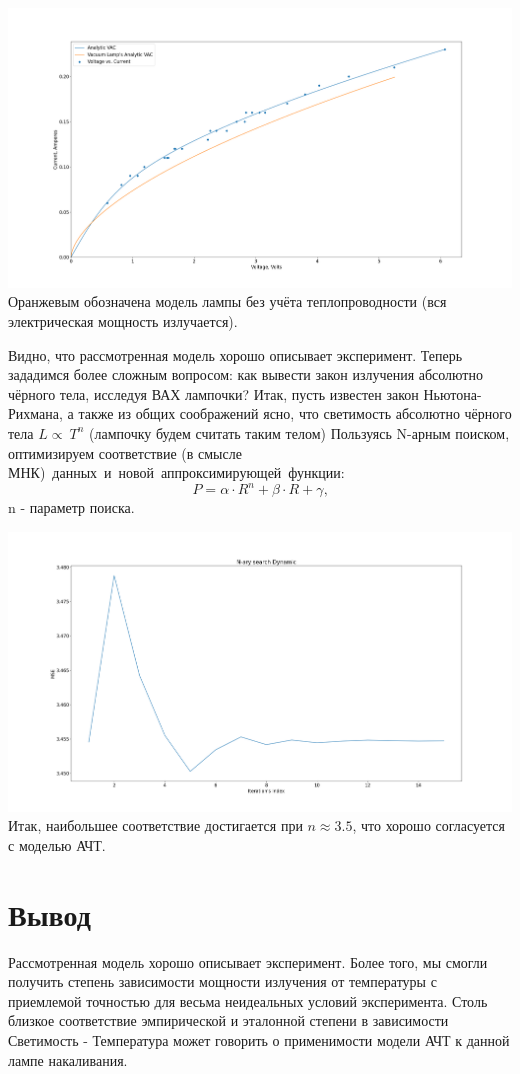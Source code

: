 \documentclass[12pt]{article}
\begin{document}
    {
        \centering
        \includegraphics[width=\linewidth]{images/Resultant_VAC.png}
        \label{fig:resultant-VAC}
    }
    Оранжевым обозначена модель лампы без учёта теплопроводности (вся электрическая мощность излучается).


    Видно, что рассмотренная модель хорошо описывает эксперимент. Теперь зададимся более сложным вопросом: как вывести закон излучения абсолютно чёрного тела, исследуя ВАХ лампочки? Итак, пусть известен закон Ньютона-Рихмана, а также из общих соображений ясно, что светимость абсолютно чёрного тела $ L \propto~ T^n $ (лампочку будем считать таким телом) Пользуясь N-арным поиском, оптимизируем соответствие (в смысле МНК)~данных~и~новой~аппроксимирующей~функции:
    \begin{equation}
        \label{new_approx_formula}
        P = \alpha \cdot R ^ n + \beta \cdot R + \gamma
        \text{,}
    \end{equation}
    n - параметр поиска.

    {
        \centering
        \includegraphics[width=\linewidth]{images/N-ary_search_dynamic.png}
    }
    Итак, наибольшее соответствие достигается при $n \approx 3.5$, что хорошо согласуется с моделью АЧТ.

    \section{Вывод}

    Рассмотренная модель хорошо описывает эксперимент.
    Более того, мы смогли получить степень зависимости мощности излучения от температуры с приемлемой точностью для весьма неидеальных условий эксперимента. Столь близкое соответствие эмпирической и эталонной степени в зависимости Светимость - Температура может говорить о применимости модели АЧТ к данной лампе накаливания.
\end{document}
